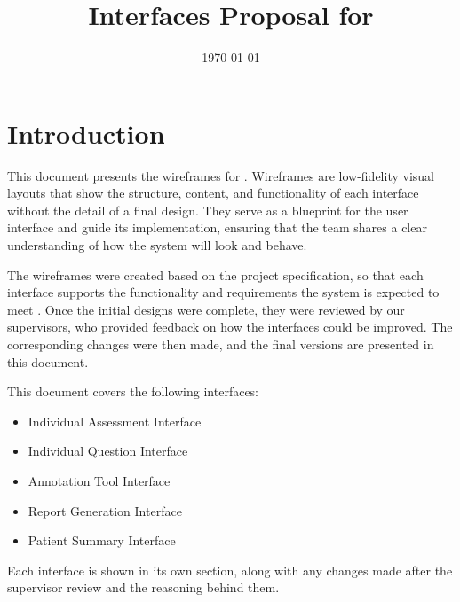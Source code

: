 \documentclass[12pt, titlepage]{article}
\begin{document}
\title{Interfaces Proposal for \progname{}} 
\author{\authname}
\date{\today}

\maketitle



\newpage

\tableofcontents


\listoffigures

\newpage


\section{Introduction}

This document presents the wireframes for \progname{}. Wireframes are low-fidelity visual layouts that show the structure, content, and functionality of each interface without the detail of a final design. 
They serve as a blueprint for the user interface and guide its implementation, ensuring that the team shares a clear understanding of how the system will look and behave.

The wireframes were created based on the project specification, so that each interface supports the functionality and requirements the system is expected to meet \citep{SRS}. 
Once the initial designs were complete, they were reviewed by our supervisors, who provided feedback on how the interfaces could be improved. The corresponding changes were then made, and the final versions are presented in this document.

This document covers the following interfaces:

\begin{itemize}
    \item Individual Assessment Interface
    \item Individual Question Interface
    \item Annotation Tool Interface
    \item Report Generation Interface
    \item Patient Summary Interface
\end{itemize}

Each interface is shown in its own section, along with any changes made after the supervisor review and the reasoning behind them.
\end{document}
